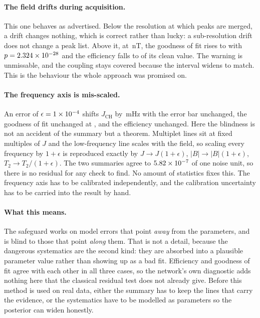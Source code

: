 \documentclass[11pt,a4paper]{article}
\newcommand{\JCH}{$J_{\mathrm{CH}}$}
\begin{document}
\paragraph{The field drifts during acquisition.} This one behaves as
advertised. Below the resolution at which peaks are merged, a drift changes
nothing, which is correct rather than lucky: a sub-resolution drift does not
change a peak list. Above it, at
\zMisspecificationDriftWorstLevel\,nT, the goodness of fit rises to
\zMisspecificationDriftChiTwoPerDofAtWorst{} with $p =
2.324\times10^{-28}$ and the efficiency falls to
\zMisspecificationDriftEfficiencyRatio{} of its clean value. The warning is
unmissable, and the coupling stays covered because the interval widens to
match. This is the behaviour the whole approach was promised on.

\paragraph{The frequency axis is mis-scaled.} An error of
$\epsilon = 1\times10^{-4}$ shifts \JCH{} by
\zMisspecificationAxisScaleBiasAtWorstMhz\,mHz with the error bar unchanged,
the goodness of fit unchanged at
\zMisspecificationAxisScaleChiTwoPerDofAtWorst, and the efficiency unchanged.
Here the blindness is not an accident of the summary but a theorem. Multiplet
lines sit at fixed multiples of $J$ and the low-frequency line scales with the
field, so scaling every frequency by $1+\epsilon$ is reproduced exactly by
$J \to J(1+\epsilon)$, $|B| \to |B|(1+\epsilon)$, $T_2 \to T_2/(1+\epsilon)$.
The two summaries agree to
$5.82\times10^{-7}$ of one noise unit, so there is no
residual for any check to find. No amount of statistics fixes this. The
frequency axis has to be calibrated independently, and the calibration
uncertainty has to be carried into the result by hand.

\paragraph{What this means.} The safeguard works on model errors that point
\emph{away} from the parameters, and is blind to those that point \emph{along}
them. That is not a detail, because the dangerous systematics are the second
kind: they are absorbed into a plausible parameter value rather than showing up
as a bad fit. Efficiency and goodness of fit agree with each other in all three
cases, so the network's own diagnostic adds nothing here that the classical
residual test does not already give. Before this method is used on real data,
either the summary has to keep the lines that carry the evidence, or the
systematics have to be modelled as parameters so the posterior can widen
honestly.
\end{document}
